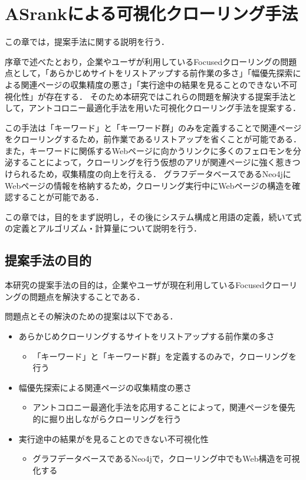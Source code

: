 

\chapter{ASrankによる可視化クローリング手法}

この章では，提案手法に関する説明を行う．

序章で述べたとおり，企業やユーザが利用しているFocusedクローリングの問題点として，「あらかじめサイトをリストアップする前作業の多さ」「幅優先探索による関連ページの収集精度の悪さ」「実行途中の結果を見ることのできない不可視化性」が存在する．
そのため本研究ではこれらの問題を解決する提案手法として，アントコロニー最適化手法を用いた可視化クローリング手法を提案する．

この手法は「キーワード」と「キーワード群」のみを定義することで関連ページをクローリングするため，前作業であるリストアップを省くことが可能である．
また，キーワードに関係するWebページに向かうリンクに多くのフェロモンを分泌することによって，クローリングを行う仮想のアリが関連ページに強く惹きつけられるため，収集精度の向上を行える．
グラフデータベースであるNeo4jにWebページの情報を格納するため，クローリング実行中にWebページの構造を確認することが可能である．

この章では，目的をまず説明し，その後にシステム構成と用語の定義，続いて式の定義とアルゴリズム・計算量について説明を行う．

\section{提案手法の目的}

本研究の提案手法の目的は，企業やユーザが現在利用しているFocusedクローリングの問題点を解決することである．

問題点とその解決のための提案は以下である．

\begin{itemize}
    \item あらかじめクローリングするサイトをリストアップする前作業の多さ
        \begin{itemize}
            \item 「キーワード」と「キーワード群」を定義するのみで，クローリングを行う
        \end{itemize}
    \item 幅優先探索による関連ページの収集精度の悪さ 
        \begin{itemize}
            \item アントコロニー最適化手法を応用することによって，関連ページを優先的に掘り出しながらクローリングを行う
        \end{itemize}
    \item 実行途中の結果がを見ることのできない不可視化性
        \begin{itemize}
            \item グラフデータベースであるNeo4jで，クローリング中でもWeb構造を可視化する 
        \end{itemize}
\end{itemize}

